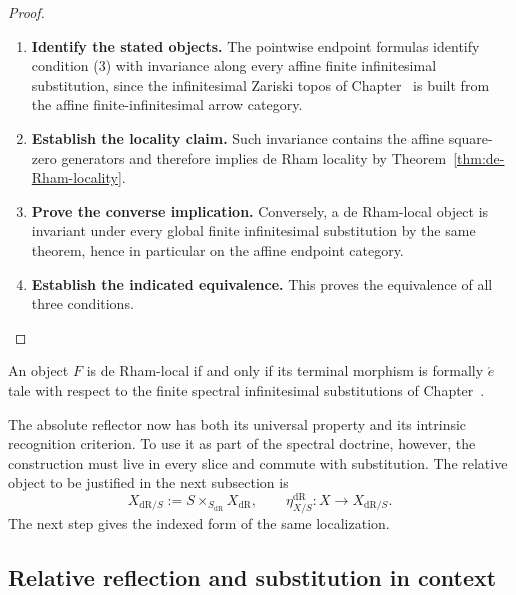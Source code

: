 \begin{proof}
\leavevmode
\begin{enumerate}[label=\textup{(\arabic*)}]
    \item \textbf{Identify the stated objects.}
    The pointwise endpoint formulas identify condition \textup{(3)} with invariance
    along every affine finite infinitesimal substitution, since the infinitesimal Zariski topos of
    Chapter~ is built from the affine
    finite-infinitesimal arrow category.
    \item \textbf{Establish the locality claim.}
    Such invariance contains the affine
    square-zero generators and therefore implies de Rham locality by
    Theorem~\ref{thm:de-Rham-locality}.
    \item \textbf{Prove the converse implication.}
    Conversely, a de Rham-local object is
    invariant under every global finite infinitesimal substitution by the same theorem,
    hence in particular on the affine endpoint category.
    \item \textbf{Establish the indicated equivalence.}
    This proves the equivalence
    of all three conditions.
\end{enumerate}
\end{proof}

\begin{corollary}
An object \(F\) is de Rham-local if and only if its terminal morphism is formally
\(\acute{e}\)tale with respect to the finite spectral infinitesimal substitutions of
Chapter~.
\end{corollary}


The absolute reflector now has both its universal property and its intrinsic
recognition criterion. To use it as part of the spectral doctrine, however,
the construction must live in every slice and commute with substitution. The
relative object to be justified in the next subsection is
\[
  X_{\mathrm{dR}/S}
  :=
  S\times_{S_{\mathrm{dR}}}X_{\mathrm{dR}},
  \qquad
  \eta_{X/S}^{\mathrm{dR}}:X\longrightarrow X_{\mathrm{dR}/S}.
\]
The next step gives the indexed form of the same localization.
\subsection{Relative reflection and substitution in context}
\label{sec:relative-de-Rham}

